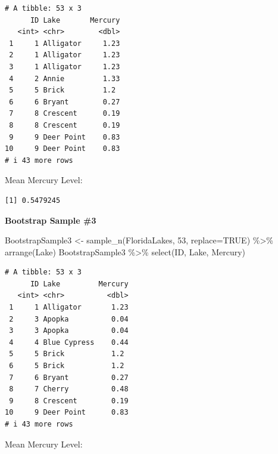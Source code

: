 \documentclass[
  letterpaper,
  DIV=11,
  numbers=noendperiod]{scrreprt}
\newenvironment{Shaded}{\begin{snugshade}}{\end{snugshade}}
\newcommand{\AttributeTok}[1]{\textcolor[rgb]{0.40,0.45,0.13}{#1}}
\newcommand{\ConstantTok}[1]{\textcolor[rgb]{0.56,0.35,0.01}{#1}}
\newcommand{\DecValTok}[1]{\textcolor[rgb]{0.68,0.00,0.00}{#1}}
\newcommand{\FunctionTok}[1]{\textcolor[rgb]{0.28,0.35,0.67}{#1}}
\newcommand{\NormalTok}[1]{\textcolor[rgb]{0.00,0.23,0.31}{#1}}
\newcommand{\OtherTok}[1]{\textcolor[rgb]{0.00,0.23,0.31}{#1}}
\newcommand{\SpecialCharTok}[1]{\textcolor[rgb]{0.37,0.37,0.37}{#1}}
\begin{document}
\begin{verbatim}
# A tibble: 53 x 3
      ID Lake       Mercury
   <int> <chr>        <dbl>
 1     1 Alligator     1.23
 2     1 Alligator     1.23
 3     1 Alligator     1.23
 4     2 Annie         1.33
 5     5 Brick         1.2 
 6     6 Bryant        0.27
 7     8 Crescent      0.19
 8     8 Crescent      0.19
 9     9 Deer Point    0.83
10     9 Deer Point    0.83
# i 43 more rows
\end{verbatim}

Mean Mercury Level:

\begin{Shaded}
\end{Shaded}

\begin{verbatim}
[1] 0.5479245
\end{verbatim}

\textbf{Bootstrap Sample \#3}

\begin{Shaded}
\begin{Highlighting}[]
\NormalTok{BootstrapSample3 }\OtherTok{\textless{}{-}} \FunctionTok{sample\_n}\NormalTok{(FloridaLakes, }\DecValTok{53}\NormalTok{, }\AttributeTok{replace=}\ConstantTok{TRUE}\NormalTok{) }\SpecialCharTok{\%\textgreater{}\%} \FunctionTok{arrange}\NormalTok{(Lake)}
\NormalTok{BootstrapSample3 }\SpecialCharTok{\%\textgreater{}\%} \FunctionTok{select}\NormalTok{(ID, Lake, Mercury)}
\end{Highlighting}
\end{Shaded}

\begin{verbatim}
# A tibble: 53 x 3
      ID Lake         Mercury
   <int> <chr>          <dbl>
 1     1 Alligator       1.23
 2     3 Apopka          0.04
 3     3 Apopka          0.04
 4     4 Blue Cypress    0.44
 5     5 Brick           1.2 
 6     5 Brick           1.2 
 7     6 Bryant          0.27
 8     7 Cherry          0.48
 9     8 Crescent        0.19
10     9 Deer Point      0.83
# i 43 more rows
\end{verbatim}

Mean Mercury Level:

\begin{Shaded}
\end{Shaded}
\end{document}
